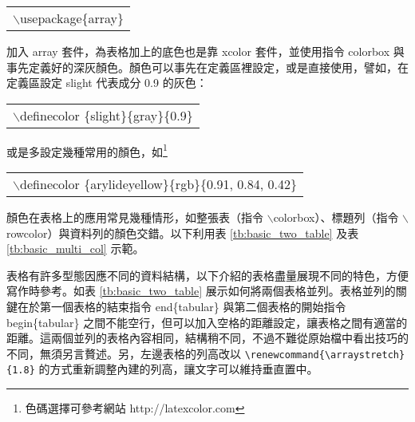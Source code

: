 \begin{center}\colorbox{slight}{\begin{tabular}{p{}}
	{\A $\backslash$usepackage\{array\}}
\end{tabular}}\end{center}
\bigskip
加入 {\A array} 套件，為表格加上的底色也是靠 {\A xcolor} 套件，並使用指令 {\A colorbox} 與事先定義好的深灰顏色。顏色可以事先在定義區裡設定，或是直接使用，譬如，在定義區設定 slight 代表成分 0.9 的灰色：

\begin{center}\colorbox{slight}{\begin{tabular}{p{}}
	 {\A $\backslash$definecolor \{slight\}\{gray\}\{0.9\}	}
\end{tabular}}\end{center}
\bigskip
或是多設定幾種常用的顏色，如\footnote{色碼選擇可參考網站 http://latexcolor.com}

\begin{center}\colorbox{arylideyellow}{\begin{tabular}{p{}}
	 {\A $\backslash$definecolor \{arylideyellow\}\{rgb\}\{0.91, 0.84, 0.42\}	}
\end{tabular}}\end{center}
\bigskip

顏色在表格上的應用常見幾種情形，如整張表（指令 $\backslash$colorbox）、標題列（指令 $\backslash$rowcolor）與資料列的顏色交錯。以下利用表 \ref{tb:basic_two_table} 及表 \ref{tb:basic_multi_col} 示範。

表格有許多型態因應不同的資料結構，以下介紹的表格盡量展現不同的特色，方便寫作時參考。如表 \ref{tb:basic_two_table} 展示如何將兩個表格並列。表格並列的關鍵在於第一個表格的結束指令 {\A end\{tabular\}} 與第二個表格的開始指令 {\A begin\{tabular\}} 之間不能空行，但可以加入空格的距離設定，讓表格之間有適當的距離。這兩個並列的表格內容相同，結構稍不同，不過不難從原始檔中看出技巧的不同，無須另言贅述。另，左邊表格的列高改以 \verb+\renewcommand{\arraystretch}{1.8}+ 的方式重新調整內建的列高，讓文字可以維持垂直置中。

